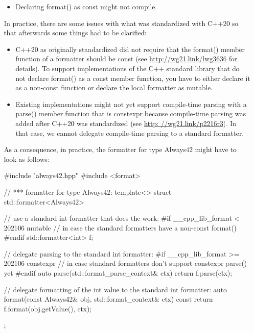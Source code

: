 \begin{itemize}
\item
Declaring format() as const might not compile.
\end{itemize}


In practice, there are some issues with what was standardized with C++20 so that afterwards some things had to be clarified:

\begin{itemize}
\item
C++20 as originally standardized did not require that the format() member function of a formatter should be const (see \url{http://wg21.link/lwg3636} for details). To support implementations of the C++ standard library that do not declare format() as a const member function, you have to either declare it as a non-const function or declare the local formatter as mutable.

\item
Existing implementations might not yet support compile-time parsing with a parse() member function that is constexpr because compile-time parsing was added after C++20 was standardized (see \url{http: //wg21.link/p2216r3}). In that case, we cannot delegate compile-time parsing to a standard formatter.
\end{itemize}

As a consequence, in practice, the formatter for type Always42 might have to look as follows:


\begin{cpp}
#include "always42.hpp"
#include <format>

// *** formatter for type Always42:
template<>
struct std::formatter<Always42>
{
	// use a standard int formatter that does the work:
#if __cpp_lib_format < 202106
	mutable // in case the standard formatters have a non-const format()
#endif
	std::formatter<int> f;
	
	// delegate parsing to the standard int formatter:
#if __cpp_lib_format >= 202106
	constexpr // in case standard formatters don’t support constexpr parse() yet
#endif
	auto parse(std::format_parse_context& ctx) {
		return f.parse(ctx);
	}
	
	// delegate formatting of the int value to the standard int formatter:
	auto format(const Always42& obj, std::format_context& ctx) const {
		return f.format(obj.getValue(), ctx);
	}
};
\end{cpp}

